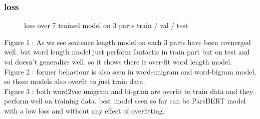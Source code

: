 \documentclass[10pt, a4paper]{article}
\begin{document}
\subsubsection{loss}
\begin{figure}[H]
    \centering
    \hfill %
    \hfill
    \caption{loss over 7 trained model on 3 parts train / val / test}
\end{figure}
Figure 1 : As we see sentence length model on each 3 parts have been covnerged well. but word length model just perform fantastic in train part but on test and val doesn't generalize well.
so it shows there is over-fit word length model. \\
Figure 2 : former behaviour is also seen in word-unigram and word-bigram model, so these models also overfit to just train data.
\\
Figure 3 : both word2vec unigram and bi-gram are overfit to train data and they perform well on training data. best model seen so far can be ParsBERT model with a low loss and without any effect of overfitting.
\end{document}
